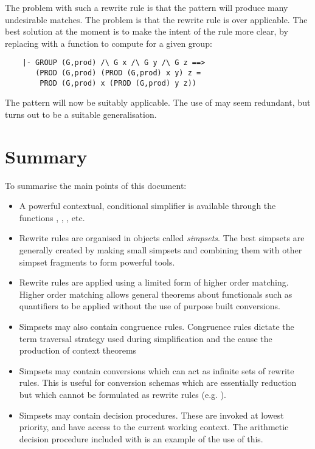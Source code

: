 The problem with such a rewrite rule is that the pattern
 will produce many undesirable matches.
The problem is that the rewrite rule is over applicable.  The
best solution at the moment is to make the intent of the rule
more clear, by replacing  with a function
to compute  for a given group:
\begin{hol} \begin{verbatim}
    |- GROUP (G,prod) /\ G x /\ G y /\ G z ==>
       (PROD (G,prod) (PROD (G,prod) x y) z =
        PROD (G,prod) x (PROD (G,prod) y z))
\end{verbatim} \end{hol}
The pattern  will
now be suitably applicable.  The use of  may seem
redundant, but turns out to be a suitable generalisation.

\section{Summary}

To summarise the main points of this document:
\begin{itemize}
    \item A powerful contextual, conditional simplifier is available
    through the functions , ,
    ,  etc.
    \item Rewrite rules are organised in objects called {\it simpsets}.
    The best simpsets are generally created by making small simpsets and
    combining them with other simpset fragments to form powerful tools.
    \item Rewrite rules are applied using a limited form of higher
    order matching.  Higher order matching allows general theorems about
    functionals such as quantifiers to be applied without the use
    of purpose built conversions.
    \item Simpsets may also contain congruence rules.  Congruence
    rules dictate the term traversal strategy used during simplification
    and the cause the production of context theorems
    \item Simpsets may contain conversions which can act as infinite sets
    of rewrite rules.  This is useful for conversion schemas
    which are essentially reduction but which cannot be formulated
    as rewrite rules (e.g. ).
    \item Simpsets may contain decision procedures.  These are invoked
    at lowest priority, and have access to the current working
    context.  The arithmetic decision procedure included with
     is an example of the use of this.
\end{itemize}

